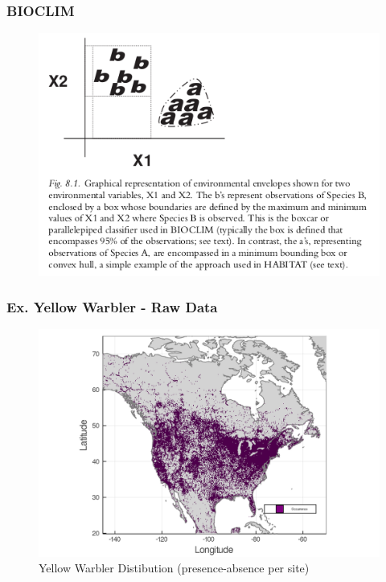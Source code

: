 \documentclass[10pt]{beamer}
\begin{document}
\begin{frame}
  \frametitle{BIOCLIM}
  \begin{figure}
    \centering
    \hspace*{-0cm}\includegraphics[scale=0.5]{fig/bioclim-with-caption.png}
  \end{figure}
\end{frame}

\begin{frame}
  \frametitle{Ex. Yellow Warbler - Raw Data}
  \begin{figure}
    \centering
    \hspace*{-0cm}\includegraphics[scale=0.17]{fig/01_raw_singlesp.png}
    \caption{Yellow Warbler Distibution (presence-absence per site)}
  \end{figure}
\end{frame}
\end{document}
